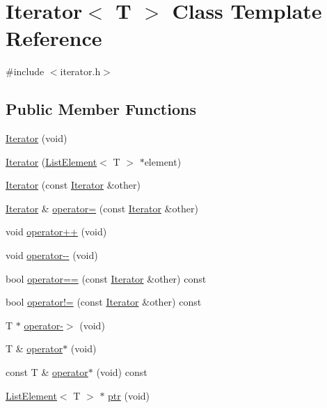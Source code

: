 \hypertarget{class_iterator}{\section{Iterator$<$ T $>$ Class Template Reference}
\label{class_iterator}
}


{\ttfamily \#include $<$iterator.\-h$>$}

\subsection*{Public Member Functions}
\begin{DoxyCompactItemize}
\item 
\hyperlink{class_iterator_aa20e8ac4107e8cb5c2a4b3d798e4a67d}{Iterator} (void)
\item 
\hyperlink{class_iterator_a3c2f2e3480da7f007ef8f60b242dddd2}{Iterator} (\hyperlink{struct_list_element}{List\-Element}$<$ T $>$ $\ast$element)
\item 
\hyperlink{class_iterator_adbb2df52fe3a48f8173a0523796946a7}{Iterator} (const \hyperlink{class_iterator}{Iterator} \&other)
\item 
\hyperlink{class_iterator}{Iterator} \& \hyperlink{class_iterator_a309bf836c7c1a766158c91c71039b9ba}{operator=} (const \hyperlink{class_iterator}{Iterator} \&other)
\item 
void \hyperlink{class_iterator_ad693c5eb1084d7436bfdbcd8d65970f4}{operator++} (void)
\item 
void \hyperlink{class_iterator_ae333b628d5b801bb2d8c9f73bca66540}{operator-\/-\/} (void)
\item 
bool \hyperlink{class_iterator_a4d4b7c135f5780c35bc9ed93555fca43}{operator==} (const \hyperlink{class_iterator}{Iterator} \&other) const 
\item 
bool \hyperlink{class_iterator_a7843a94235eb651c2a17209d4ec6ee0e}{operator!=} (const \hyperlink{class_iterator}{Iterator} \&other) const 
\item 
T $\ast$ \hyperlink{class_iterator_ae457c048dcc3c16f750fc2af840d67c4}{operator-\/$>$} (void)
\item 
T \& \hyperlink{class_iterator_acec070b02aca6eda39f0c50e7bb46384}{operator$\ast$} (void)
\item 
const T \& \hyperlink{class_iterator_ae726c92d023ab6917407315e79f1adc0}{operator$\ast$} (void) const 
\item 
\hyperlink{struct_list_element}{List\-Element}$<$ T $>$ $\ast$ \hyperlink{class_iterator_a7196990c5f8d312318ebd4a906715c18}{ptr} (void)
\end{DoxyCompactItemize}



